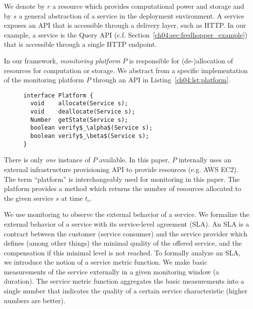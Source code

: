 We denote by $r$ a resource which provides computational power and storage
and by $s$ a general abstraction of a service in the deployment environment. 
A service exposes an API that is accessible through a delivery layer, such as HTTP.
In our example, a service is the Query API (c.f. Section~\ref{ch04:sec:fredhopper_example}) that is accessible through a single HTTP endpoint.

In our framework, 
\emph{monitoring platform}  $P$ is responsible for (de-)allocation of resources for computation or storage.
We abstract from a specific implementation of the monitoring platform $P$ through an API in Listing~\ref{ch04:lst:platform}. 
% 

\lstset{language=java,aboveskip=-20pt,belowskip=-20pt}
\begin{figure}[h]
\begin{center}
\begin{lstlisting}[mathescape,caption=Platform API,label=lst:platform]
interface Platform {
  void    allocate(Service s);
  void    deallocate(Service s);
  Number  getState(Service s);
  boolean verify$_\alpha$(Service s);
  boolean verify$_\beta$(Service s);
}
\end{lstlisting}
\end{center}   
\end{figure}
\lstset{mathescape=false}
% 

There is only \emph{one} instance of $P$ available.
In this paper, $P$ internally uses an external infrastructure provisioning API to provide resources (e.g. AWS EC2).
The term ``platform'' is interchangeably used for monitoring in this paper.
The platform provides a method  which returns
the number of resources allocated to the given service $s$ at time $t_c$.

We use monitoring to observe the external behavior of a service.
We formalize the external behavior of a service with its service-level agreement (SLA).
An SLA is a contract between the customer (service consumer) and the service provider
which defines (among other things) the minimal quality of the offered service,
and the compensation if this minimal level is not reached.
To formally analyze an SLA, we introduce the notion of a service metric function.
We make basic measurements of the service externally in a given monitoring window (a duration).
The service metric function aggregates the basic measurements into a single number
that indicates the quality of a certain service characteristic (higher numbers are better).
%


